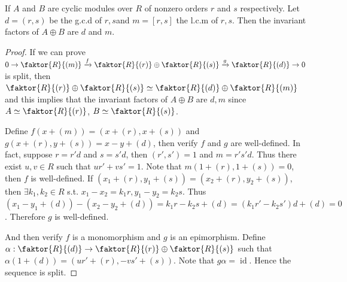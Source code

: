 \documentclass{article}
\begin{document}
\begin{proposition}
    If $A$ and $B$ are cyclic modules over $R$ of nonzero orders $r$ and $s$ respectively. Let $d=(r,s)$ be the g.c.d of $r,s$and $m=[r,s]$ the l.c.m of $r,s$. Then the invariant factors of $A \oplus B$ are $d$ and $m$.
\end{proposition}
\begin{proof}
    If we can prove $0\to \faktor{R}{(m)}\xrightarrow{f}\faktor{R}{(r)}\oplus \faktor{R}{(s)}\xrightarrow{g}\faktor{R}{(d)}\to 0$ is split, then $\faktor{R}{(r)}\oplus \faktor{R}{(s)} \simeq \faktor{R}{(d)} \oplus \faktor{R}{(m)}$ and this implies that the invariant factors of $A\oplus B$ are $d,m$ since $A \simeq \faktor{R}{(r)}$, $B \simeq \faktor{R}{(s)}$. 

    Define $f(x+(m))=(x+(r),x+(s))$ and $g(x+(r),y+(s))=x-y+(d)$, then verify $f$ and $g$ are well-defined. In fact, suppose $r=r'd$ and $s=s'd$, then $(r',s')=1$ and $m=r's'd$. Thus there exist $u,v \in R$ such that $ur'+vs'=1$. Note that $m(1+(r),1+(s))=0$, then $f$ is well-defined. If $(x_{1}+(r),y_{1}+(s))=(x_{2}+(r),y_{2}+(s))$, then $\exists k_{1},k_{2} \in R$ s.t. $x_{1}-x_{2}=k_{1}r, y_{1}-y_{2}=k_{2}s$. Thus $(x_{1}-y_{1}+(d))-(x_{2}-y_{2}+(d))=k_{1}r-k_{2}s+(d)=(k_{1}r'-k_{2}s')d+(d)=0$. Therefore $g$ is well-defined.
    
    And then verify $f$ is a monomorphism and $g$ is an epimorphism. Define $\alpha:\faktor{R}{(d)}\to \faktor{R}{(r)}\oplus \faktor{R}{(s)}$ such that $\alpha(1+(d))=(ur'+(r),-vs'+(s))$. Note that $g \alpha=\operatorname{id}$. Hence the sequence is split.
\end{proof}


\newpage
\end{document}
